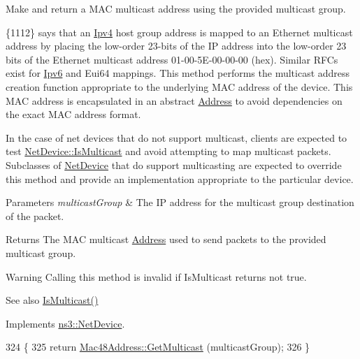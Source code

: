 Make and return a M\+AC multicast address using the provided multicast group. 

\{1112\} says that an \hyperlink{classns3_1_1Ipv4}{Ipv4} host group address is mapped to an Ethernet multicast address by placing the low-\/order 23-\/bits of the IP address into the low-\/order 23 bits of the Ethernet multicast address 01-\/00-\/5\+E-\/00-\/00-\/00 (hex). Similar R\+F\+Cs exist for \hyperlink{classns3_1_1Ipv6}{Ipv6} and Eui64 mappings. This method performs the multicast address creation function appropriate to the underlying M\+AC address of the device. This M\+AC address is encapsulated in an abstract \hyperlink{classns3_1_1Address}{Address} to avoid dependencies on the exact M\+AC address format.

In the case of net devices that do not support multicast, clients are expected to test \hyperlink{classns3_1_1NetDevice_a1afb4848a9226540f1ff51f9b31ae95e}{Net\+Device\+::\+Is\+Multicast} and avoid attempting to map multicast packets. Subclasses of \hyperlink{classns3_1_1NetDevice}{Net\+Device} that do support multicasting are expected to override this method and provide an implementation appropriate to the particular device.


\begin{DoxyParams}{Parameters}
{\em multicast\+Group} & The IP address for the multicast group destination of the packet. \\
\hline
\end{DoxyParams}
\begin{DoxyReturn}{Returns}
The M\+AC multicast \hyperlink{classns3_1_1Address}{Address} used to send packets to the provided multicast group.
\end{DoxyReturn}
\begin{DoxyWarning}{Warning}
Calling this method is invalid if Is\+Multicast returns not true. 
\end{DoxyWarning}
\begin{DoxySeeAlso}{See also}
\hyperlink{classns3_1_1WifiNetDevice_a5147f0411c79044bdced20b96bcad663}{Is\+Multicast()} 
\end{DoxySeeAlso}


Implements \hyperlink{classns3_1_1NetDevice_a98aa4852df367b6a393c8cc1d88af0d9}{ns3\+::\+Net\+Device}.


\begin{DoxyCode}
324 \{
325   \textcolor{keywordflow}{return} \hyperlink{classns3_1_1Mac48Address_a23d170f8c7a7d90a8110425620285819}{Mac48Address::GetMulticast} (multicastGroup);
326 \}
\end{DoxyCode}


